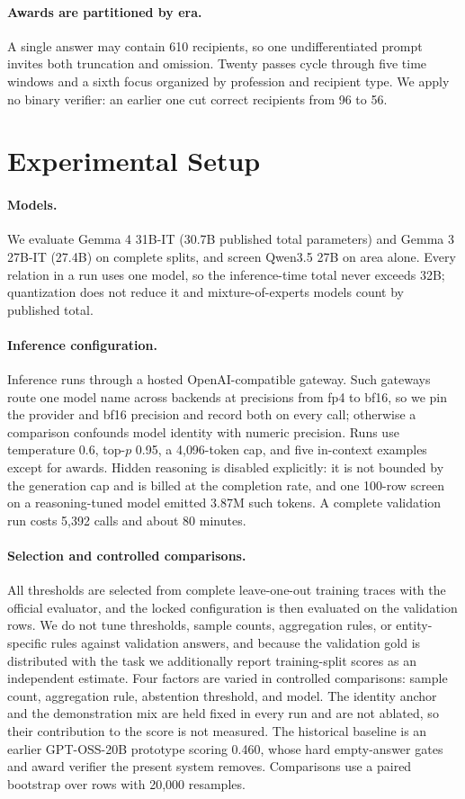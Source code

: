 \documentclass[11pt]{article}
\begin{document}
\paragraph{Awards are partitioned by era.}
A single answer may contain 610 recipients, so one undifferentiated prompt
invites both truncation and omission. Twenty passes cycle through five time
windows and a sixth focus organized by profession and recipient type. We apply
no binary verifier: an earlier one cut correct recipients from 96 to 56.

\section{Experimental Setup}
\label{sec:experiments}

\paragraph{Models.}
We evaluate Gemma 4 31B-IT (30.7B published total parameters) and Gemma 3
27B-IT (27.4B) on complete splits, and screen Qwen3.5 27B on area alone. Every
relation in a run uses one model, so the inference-time total never exceeds
32B; quantization does not reduce it and mixture-of-experts models count by
published total.

\paragraph{Inference configuration.}
Inference runs through a hosted OpenAI-compatible gateway. Such gateways route
one model name across backends at precisions from fp4 to bf16, so we pin the
provider and bf16 precision and record both on every call; otherwise a
comparison confounds model identity with numeric precision. Runs
use temperature 0.6, top-$p$ 0.95, a 4{,}096-token cap, and five in-context
examples except for awards. Hidden reasoning is disabled explicitly: it is not
bounded by the generation cap and is billed at the completion rate, and one
100-row screen on a reasoning-tuned model emitted 3.87M such tokens. A complete
validation run costs 5{,}392 calls and about 80 minutes.

\paragraph{Selection and controlled comparisons.}
All thresholds are selected from complete leave-one-out training traces with
the official evaluator, and the locked configuration is then evaluated on the
validation rows. We do not tune thresholds, sample counts, aggregation rules,
or entity-specific rules against validation answers, and because the validation
gold is distributed with the task we additionally report training-split scores
as an independent estimate. Four factors are varied in controlled comparisons:
sample count, aggregation rule, abstention threshold, and model. The identity
anchor and the demonstration mix are held fixed in every run and are not
ablated, so their contribution to the score is not measured. The historical
baseline is an earlier GPT-OSS-20B prototype scoring 0.460, whose hard
empty-answer gates and award verifier the present system removes. Comparisons
use a paired bootstrap over rows with 20{,}000 resamples.
\end{document}
